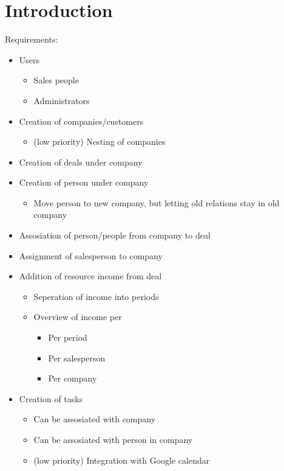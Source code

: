 \chapter{Introduction}
\label{chap:Introduction}

Requirements:
\begin{itemize}
  \item Users
  \begin{itemize}
    \item Sales people
    \item Administrators
  \end{itemize}
  \item Creation of companies/customers
  \begin{itemize}
    \item (low priority) Nesting of companies
  \end{itemize}
  \item Creation of deals under company
  \item Creation of person under company
  \begin{itemize}
    \item Move person to new company, but letting old relations stay in old company
  \end{itemize}
  \item Assosiation of person/people from company to deal
  \item Assignment of salesperson to company
  \item Addition of resource income from deal
  \begin{itemize}
    \item Seperation of income into periods
    \item Overview of income per
    \begin{itemize}
      \item Per period
      \item Per salesperson
      \item Per company
    \end{itemize}
  \end{itemize}
  \item Creation of tasks
  \begin{itemize}
    \item Can be assosiated with company
    \item Can be assosiated with person in company
    \item (low priority) Integration with Google calendar
  \end{itemize}
\end{itemize}
